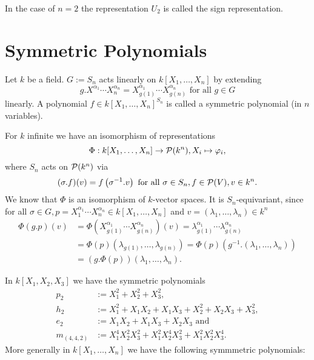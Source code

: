 \begin{rem}
 In the case of $n = 2$ the representation $U_2$ is called the sign representation.
\end{rem}


\section{Symmetric Polynomials}


\begin{defi}
 Let $k$ be a field. $G := S_n$ acts linearly on $k[X_1, \ldots, X_n]$ by extending
 \[
  g.X^{\alpha_1} \cdots X_n^{\alpha_n} = X_{g(1)}^{\alpha_1} \cdots X_{g(n)}^{\alpha_n} \text{ for all } g \in G
 \]
 linearly. A polynomial $f \in k[X_1, \ldots, X_n]^{S_n}$ is called a symmetric polynomial (in $n$ variables).
\end{defi}


\begin{rem}
 For $k$ infinite we have an isomorphism of representations
 \[
  \Phi : k[X_1, \ldots, X_n] \to \mathcal{P}(k^n), X_i \mapsto \varphi_i,
 \]
 where $S_n$ acts on $\mathcal{P}(k^n)$ via
 \[
  (\sigma.f)(v) = f\left( \sigma^{-1}.v \right) \text{ for all } \sigma \in S_n, f \in \mathcal{P}(V), v \in k^n.
 \]
 We know that $\Phi$ is an isomorphism of $k$-vector spaces. It is $S_n$-equivariant, since for all $\sigma \in G, p = X_1^{\alpha_1} \cdots X_n^{\alpha_n} \in k[X_1, \ldots, X_n]$ and $v = (\lambda_1, \ldots, \lambda_n) \in k^n$
 \begin{align*}
  \Phi(g.p)(v)
  &= \Phi\left( X_{g(1)}^{\alpha_1} \cdots X_{g(n)}^{\alpha_n} \right)(v)
  = \lambda_{g(1)}^{\alpha_1} \cdots \lambda_{g(n)}^{\alpha_n} \\
  &= \Phi(p)( \lambda_{g(1)}, \ldots, \lambda_{g(n)} )
  = \Phi(p)\left( g^{-1}.(\lambda_1, \ldots, \lambda_n) \right) \\
  &= (g.\Phi(p))(\lambda_1, \ldots, \lambda_n).
 \end{align*}
\end{rem}


\begin{expl}
 In $k[X_1, X_2, X_3]$ we have the symmetric polynomials
 \begin{align*}
  p_2 &:= X_1^2 + X_2^2 + X_3^2, \\
  h_2 &:= X_1^2 + X_1 X_2 + X_1 X_3 + X_2^2 + X_2 X_3 + X_3^2, \\
  e_2 &:= X_1 X_2 + X_1 X_3 + X_2 X_3 \text{ and} \\
  m_{(4,4,2)} &:= X_1^4 X_2^2 X_3^2 + X_1^2 X_2^4 X_3^2 + X_1^2 X_2^2 X_3^4.
 \end{align*}
 More generally in $k[X_1, \ldots, X_n]$ we have the following symmmetric polynomials:
\end{expl}


